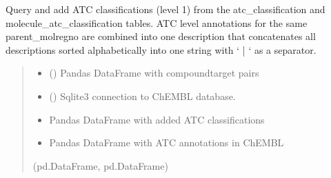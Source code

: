 \documentclass[letterpaper,10pt,english]{sphinxmanual}
\begin{document}
\begin{fulllineitems}
\label{\detokenize{add_chembl_compound_properties:add_chembl_compound_properties.add_atc_classification}}
\pysigstartsignatures
{}
\pysigstopsignatures
\sphinxAtStartPar
Query and add ATC classifications (level 1) from the atc\_classification and
molecule\_atc\_classification tables.
ATC level annotations for the same parent\_molregno are combined into one description
that concatenates all descriptions sorted alphabetically
into one string with ‘ | ‘ as a separator.
\begin{quote}\begin{description}
\begin{itemize}
\item {} 
\sphinxAtStartPar
{} () \textendash{} Pandas DataFrame with compound\sphinxhyphen{}target pairs

\item {} 
\sphinxAtStartPar
{} () \textendash{} Sqlite3 connection to ChEMBL database.

\end{itemize}

\sphinxAtStartPar
\begin{itemize}
\item {} 
\sphinxAtStartPar
Pandas DataFrame with added ATC classifications 

\item {} 
\sphinxAtStartPar
Pandas DataFrame with ATC annotations in ChEMBL

\end{itemize}


\sphinxAtStartPar
(pd.DataFrame, pd.DataFrame)

\end{description}\end{quote}

\end{fulllineitems}
\end{document}

